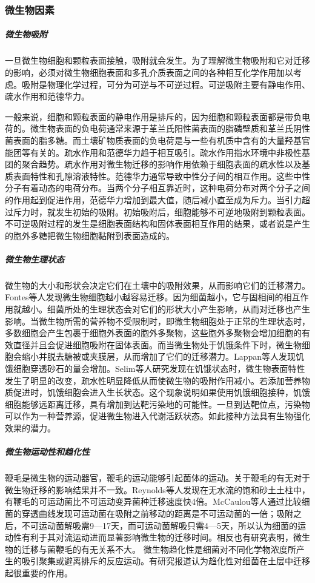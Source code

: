\documentclass[a4paper,cs4size,adobefonts,fancyhdr]{ctexart}[2005/11/25]
\numberwithin{equation}{section} %
\begin{document}
\subsubsection{微生物因素}
\subparagraph{微生物吸附}
一旦微生物细胞和颗粒表面接触，吸附就会发生。为了理解微生物吸附和它对迁移的影响，必须对微生物细胞表面和多孔介质表面之间的各种相互化学作用加以考虑。吸附是物理化学过程，可分为可逆与不可逆过程。可逆吸附主要有静电作用、疏水作用和范德华力。\par
一般来说，细胞和颗粒表面的静电作用是排斥的，因为细胞和颗粒表面都是带负电荷的。微生物表面的负电荷通常来源于革兰氏阳性菌表面的脂磷壁质和革兰氏阴性菌表面的脂多糖。而土壤矿物质表面的负电荷是与一些有机质中含有的大量羟基官能团等有关的。疏水作用和范德华力趋于相互吸引。疏水作用指水环境中非极性基团的聚合趋势。疏水作用对微生物迁移的影响作用依赖于细胞表面的疏水性以及基质表面特性和孔隙溶液特性。范德华力通常导致中性分子间的相互作用。这些中性分子有着动态的电荷分布。当两个分子相互靠近时，这种电荷分布对两个分子之间的作用起到促进作用，范德华力增加到最大值，随后减小直至成为斥力。当引力超过斥力时，就发生初始的吸附。初始吸附后，细胞能够不可逆地吸附到颗粒表面。不可逆吸附过程的发生是细胞表面结构和固体表面相互作用的结果，或者说是产生的胞外多糖把微生物细胞黏附到表面造成的。 
\subparagraph{微生物生理状态}
微生物的大小和形状会决定它们在土壤中的吸附效果，从而影响它们的迁移潜力。Fontes等人发现微生物细胞越小越容易迁移。因为细菌越小，它与固相间的相互作用就越小。细菌所处的生理状态会对它们的形状大小产生影响，从而对迁移也产生影响。当微生物所需的营养物不受限制时，即微生物细胞处于正常的生理状态时，多数细胞会产生包裹于细胞外表面的胞外多聚物，这些胞外多聚物会增加细胞的有效直径并且会促进细胞吸附在固体表面。而当微生物处于饥饿条件下时，微生物细胞会缩小并脱去糖被或夹膜层，从而增加了它们的迁移潜力。Lappan等人发现饥饿细胞穿透砂石的量会增加。Selim等人研究发现在饥饿状态时，微生物表面特性发生了明显的改变，疏水性明显降低从而使微生物的吸附作用减小。若添加营养物质促进时，饥饿细胞会进入生长状态。这个现象说明如果使用饥饿细胞接种，饥饿细胞能够远距离迁移，具有增加到达靶污染地的可能性。一旦到达靶位点，污染物可以作为一种营养源，促进微生物进入代谢活跃状态。如此接种方法具有生物强化效果的潜力。
\subparagraph{微生物运动性和趋化性}
鞭毛是微生物的运动器官，鞭毛的运动能够引起菌体的运动。关于鞭毛的有无对于微生物迁移的影响结果并不一致。Reynolds等人发现在无水流的饱和砂土土柱中，有鞭毛的可运动菌比不可运动变异菌种迁移速度快4倍。McCaulou等人通过比较细菌的穿透曲线发现可运动菌在吸附之前移动的距离是不可运动菌的一倍；吸附之后，不可运动菌解吸需9---17天，而可运动菌解吸只需4---5天，所以认为细菌的运动性有利于其对流运动进而显著影响微生物的迁移时间。相反也有研究表明，微生物的迁移与菌鞭毛的有无关系不大。 微生物趋化性是细菌对不同化学物浓度所产生的吸引聚集或避离排斥的反应运动。有研究报道认为趋化性对细菌在土层中迁移起很重要的作用。
\end{document}
